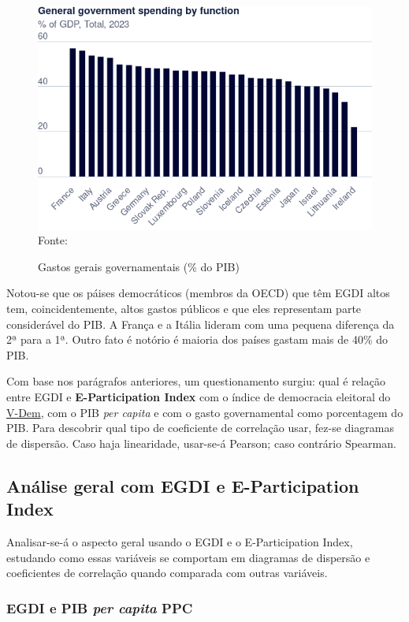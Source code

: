 \begin{figure}[H]
	\centering
	\caption{Gastos gerais governamentais (\% do PIB)}
	\includegraphics[width=1\linewidth]{figuras/government_spending/government-spending-by-function}
	\label{fig:government-spending-by-function}
	\footnotesize{Fonte: \cite{global_gov_spending_function}}
\end{figure}

Notou-se que os páises democráticos (membros da OECD) que têm EGDI altos tem, coincidentemente, altos gastos públicos e que eles representam parte considerável do PIB. A França e a Itália lideram com uma pequena diferença da 2ª para a 1ª. Outro fato é notório é maioria dos países gastam mais de 40\% do PIB.

Com base nos parágrafos anteriores, um questionamento surgiu: qual é relação entre EGDI e \textbf{E-Participation Index} com o índice de democracia eleitoral do \href{https://www.v-dem.net/}{V-Dem}, com o PIB \textit{per capita} e com o gasto governamental como porcentagem do PIB. Para descobrir qual tipo de coeficiente de correlação usar, fez-se diagramas de dispersão. Caso haja linearidade, usar-se-á Pearson; caso contrário Spearman.

\subsection{Análise geral com EGDI e E-Participation Index}

Analisar-se-á o aspecto geral usando o EGDI e o E-Participation Index, estudando como essas variáveis se comportam em diagramas de dispersão e coeficientes de correlação quando comparada com outras variáveis.

\subsubsection{EGDI e PIB \textit{per capita} PPC}

